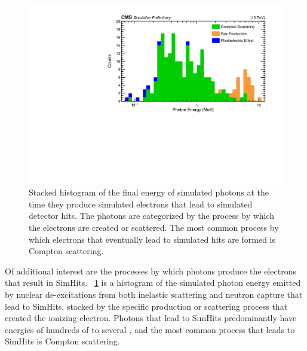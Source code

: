 \begin{figure}[htbp]
	\centering
	\includegraphics[width=\dummyFigWidth]{figures/neutron/neut_gamma_proc_energy.pdf}
  \caption[Stacked histogram of the final energy of simulated photons at the time they produce simulated electrons that lead to simulated detector hits.]{Stacked histogram of the final energy of simulated photons at the time they produce simulated electrons that lead to simulated detector hits. The photons are categorized by the process by which the electrons are created or scattered. The most common process by which electrons that eventually lead to simulated hits are formed is Compton scattering.}
	\label{fig:electron_proc}
\end{figure}

Of additional interest are the processes by which photons produce the electrons that result in SimHits. \FigDot~\ref{fig:electron_proc} is a histogram of the simulated photon energy emitted by nuclear de-excitations from both inelastic scattering and neutron capture that lead to SimHits, stacked by the specific production or scattering process that created the ionizing electron. Photons that lead to SimHits predominantly have energies of hundreds of \keVns to several \MeVns, and the most common process that leads to SimHits is Compton scattering.

